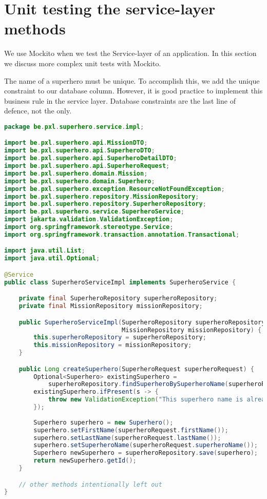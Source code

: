 \section{Unit testing the service-layer methods}


We use Mockito when we test the Service-layer of an application. In this section we discuss more complex unit tests with Mockito.

The name of a superhero must be unique. To accomplish this, we add the unique constraint to our database column. 
However, it is good practice to implement this business rule in the service layer.
Database constraints are the last line of defence, not the only. 


\begin{lstlisting}[frame=single, language=java]
package be.pxl.superhero.service.impl;

import be.pxl.superhero.api.MissionDTO;
import be.pxl.superhero.api.SuperheroDTO;
import be.pxl.superhero.api.SuperheroDetailDTO;
import be.pxl.superhero.api.SuperheroRequest;
import be.pxl.superhero.domain.Mission;
import be.pxl.superhero.domain.Superhero;
import be.pxl.superhero.exception.ResourceNotFoundException;
import be.pxl.superhero.repository.MissionRepository;
import be.pxl.superhero.repository.SuperheroRepository;
import be.pxl.superhero.service.SuperheroService;
import jakarta.validation.ValidationException;
import org.springframework.stereotype.Service;
import org.springframework.transaction.annotation.Transactional;

import java.util.List;
import java.util.Optional;

@Service
public class SuperheroServiceImpl implements SuperheroService {

    private final SuperheroRepository superheroRepository;
    private final MissionRepository missionRepository;

    public SuperheroServiceImpl(SuperheroRepository superheroRepository,
                                MissionRepository missionRepository) {
        this.superheroRepository = superheroRepository;
        this.missionRepository = missionRepository;
    }

    public Long createSuperhero(SuperheroRequest superheroRequest) {
        Optional<Superhero> existingSuperhero = 
            superheroRepository.findSuperheroBySuperheroName(superheroRequest.getSuperheroName());
        existingSuperhero.ifPresent(s -> {
            throw new ValidationException("This superhero name is already taken.");
        });
            
        Superhero superhero = new Superhero();
        superhero.setFirstName(superheroRequest.firstName());
        superhero.setLastName(superheroRequest.lastName());
        superhero.setSuperheroName(superheroRequest.superheroName());
        Superhero newSuperhero = superheroRepository.save(superhero);
        return newSuperhero.getId();
    }

    // other methods intentionally left out
}
\end{lstlisting}


